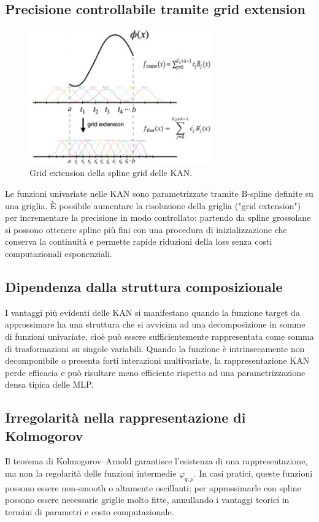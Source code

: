 \documentclass[a4paper,12pt]{report}
\begin{document}
	\subsection{Precisione controllabile tramite grid extension}
	\begin{figure}[H]
		\centering
		\includegraphics[width=0.7\textwidth]{img/grid_extension.jpg}
		\caption{Grid extension della spline grid delle KAN.}
	\end{figure}
	Le funzioni univariate nelle KAN sono parametrizzate tramite B-spline definite su una griglia. È possibile aumentare la risoluzione della griglia ("grid extension") per incrementare la precisione in modo controllato: partendo da spline grossolane si possono ottenere spline più fini con una procedura di inizializzazione che conserva la continuità e permette rapide riduzioni della loss senza costi computazionali esponenziali.
	
	\subsection{Dipendenza dalla struttura composizionale}
	I vantaggi più evidenti delle KAN si manifestano quando la funzione target da approssimare ha una struttura che si avvicina ad una decomposizione in somme di funzioni univariate, cioè può essere sufficientemente rappresentata come somma di trasformazioni su singole variabili. Quando la funzione è intrinsecamente non decomponibile o presenta forti interazioni multivariate, la rappresentazione KAN perde efficacia e può risultare meno efficiente rispetto ad una parametrizzazione densa tipica delle MLP.
	
	\subsection{Irregolarità nella rappresentazione di Kolmogorov}
	Il teorema di Kolmogorov–Arnold garantisce l'esistenza di una rappresentazione, ma non la regolarità delle funzioni intermedie \(\varphi_{q,p}\). In casi pratici, queste funzioni possono essere non-smooth o altamente oscillanti; per approssimarle con spline possono essere necessarie griglie molto fitte, annullando i vantaggi teorici in termini di parametri e costo computazionale.
	
\end{document}
